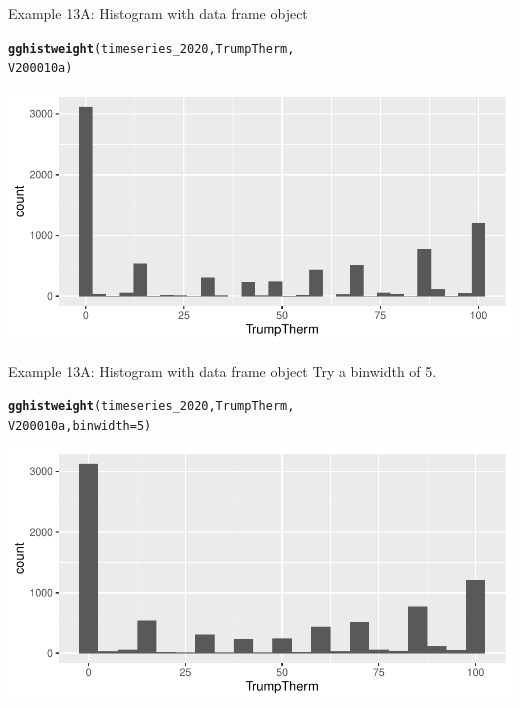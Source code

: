 \documentclass{beamer}\usepackage[]{graphicx}\usepackage[]{color}
\makeatletter
\newcommand{\hlnum}[1]{\textcolor[rgb]{0.686,0.059,0.569}{#1}}%
\newcommand{\hlstd}[1]{\textcolor[rgb]{0.345,0.345,0.345}{#1}}%
\newcommand{\hlkwc}[1]{\textcolor[rgb]{0.333,0.667,0.333}{#1}}%
\newcommand{\hlkwd}[1]{\textcolor[rgb]{0.737,0.353,0.396}{\textbf{#1}}}%
\newenvironment{kframe}{%
 \def\at@end@of@kframe{}%
 \ifinner\ifhmode%
  \def\at@end@of@kframe{\end{minipage}}%
  \begin{minipage}{\columnwidth}%
 \fi\fi%
 \def\FrameCommand##1{\hskip\@totalleftmargin \hskip-\fboxsep
 \colorbox{shadecolor}{##1}\hskip-\fboxsep
     \hskip-\linewidth \hskip-\@totalleftmargin \hskip\columnwidth}%
 \MakeFramed {\advance\hsize-\width
   \@totalleftmargin\z@ \linewidth\hsize
   \@setminipage}}%
 {\par\unskip\endMakeFramed%
 \at@end@of@kframe}
\newenvironment{knitrout}{}{} %
\makeatother
\begin{document}
\begin{frame}[fragile]{Example 13A: Histogram with data frame object}
\begin{knitrout}
\color{fgcolor}\begin{kframe}
\begin{alltt}
\hlkwd{gghistweight}\hlstd{(timeseries_2020, TrumpTherm,}
    \hlstd{V200010a)}
\end{alltt}
\end{kframe}
\includegraphics[width=0.95\linewidth]{figure/unnamed-chunk-52-1} 
\end{knitrout}

\end{frame}

\begin{frame}[fragile]{Example 13A: Histogram with data frame object}
Try a binwidth of 5.
\begin{knitrout}
\color{fgcolor}\begin{kframe}
\begin{alltt}
\hlkwd{gghistweight}\hlstd{(timeseries_2020, TrumpTherm,}
    \hlstd{V200010a,} \hlkwc{binwidth} \hlstd{=} \hlnum{5}\hlstd{)}
\end{alltt}
\end{kframe}
\includegraphics[width=0.95\linewidth]{figure/unnamed-chunk-53-1} 
\end{knitrout}

\end{frame}
\end{document}
